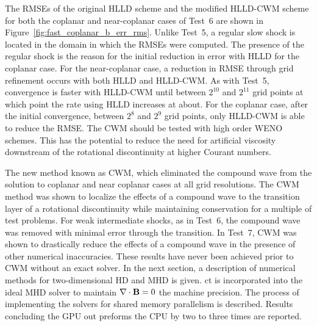 The RMSEs of the original HLLD scheme and the modified HLLD-CWM scheme for both the coplanar and near-coplanar cases of Test~6 are shown in Figure~\ref{fig:fast_coplanar_b_err_rms}.  Unlike Test~5, a regular slow shock is located in the domain in which the RMSEs were computed.  The presence of the regular shock is the reason for the initial reduction in error with HLLD for the coplanar case.  For the near-coplanar case, a reduction in RMSE through grid refinement occurs with both HLLD and HLLD-CWM.  As with Test~5, convergence is faster with HLLD-CWM until between $2^{10}$ and $2^{11}$ grid points at which point the rate using HLLD increases at about.  For the coplanar case, after the initial convergence, between $2^{8}$ and $2^{9}$ grid points, only HLLD-CWM is able to reduce the RMSE.  The CWM should be tested with high order WENO schemes.  This has the potential to reduce the need for artificial viscosity downstream of the rotational discontinuity at higher Courant numbers.

The new method known as CWM, which eliminated the compound wave from the solution to coplanar and near coplanar cases at all grid resolutions.  The CWM method was shown to localize the effects of a compound wave to the transition layer of a rotational discontinuity while maintaining conservation for a multiple of test problems.  For weak intermediate shocks, as in Test~6, the compound wave was removed with minimal error through the transition.  In Test~7, CWM was shown to drastically reduce the effects of a compound wave in the presence of other numerical inaccuracies.  These results have never been achieved prior to CWM without an exact solver.  In the next section, a description of numerical methods for two-dimensional HD and MHD is given.  \Gls{ct} is incorporated into the ideal MHD solver to maintain $\mathbf{\nabla} \cdot \mathbf{B} = 0$ the machine precision.  The process of implementing the solvers for shared memory parallelism is described.  Results concluding the GPU out preforms the CPU by two to three times are reported.  




